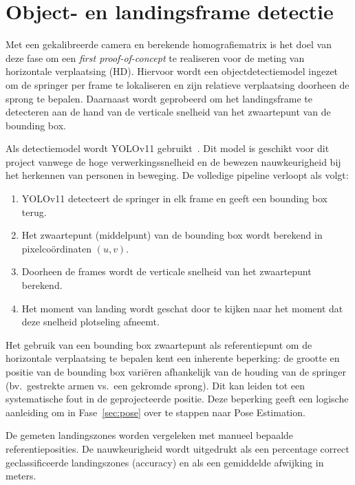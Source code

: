 
\section{Object- en landingsframe detectie}
\label{sec:yolo}

Met een gekalibreerde camera en berekende homografiematrix is het doel van deze fase om een \textit{first proof-of-concept} te realiseren voor de meting van horizontale verplaatsing (HD). Hiervoor wordt een objectdetectiemodel ingezet om de springer per frame te lokaliseren en zijn relatieve verplaatsing doorheen de sprong te bepalen. Daarnaast wordt geprobeerd om het landingsframe te detecteren aan de hand van de verticale snelheid van het zwaartepunt van de bounding box.

Als detectiemodel wordt YOLOv11 gebruikt~\autocite{Jocher_Ultralytics_YOLO_2023}. Dit model is geschikt voor dit project vanwege de hoge verwerkingssnelheid en de bewezen nauwkeurigheid bij het herkennen van personen in beweging. De volledige pipeline verloopt als volgt:

\begin{enumerate}
    \item YOLOv11 detecteert de springer in elk frame en geeft een bounding box terug.
    \item Het zwaartepunt (middelpunt) van de bounding box wordt berekend in pixelcoördinaten $(u, v)$.
    \item Doorheen de frames wordt de verticale snelheid van het zwaartepunt berekend.
    \item Het moment van landing wordt geschat door te kijken naar het moment dat deze snelheid plotseling afneemt.
\end{enumerate}

Het gebruik van een bounding box zwaartepunt als referentiepunt om de horizontale verplaatsing te bepalen kent een inherente beperking: de grootte en positie van de bounding box vari{\"e}ren afhankelijk van de houding van de springer (bv.\ gestrekte armen vs.\ een gekromde sprong). Dit kan leiden tot een systematische fout in de geprojecteerde positie. Deze beperking geeft een logische aanleiding om in Fase~\ref{sec:pose} over te stappen naar Pose Estimation.

De gemeten landingszones worden vergeleken met manueel bepaalde referentieposities. De nauwkeurigheid wordt uitgedrukt als een percentage correct geclassificeerde landingszones (accuracy) en als een gemiddelde afwijking in meters. %
